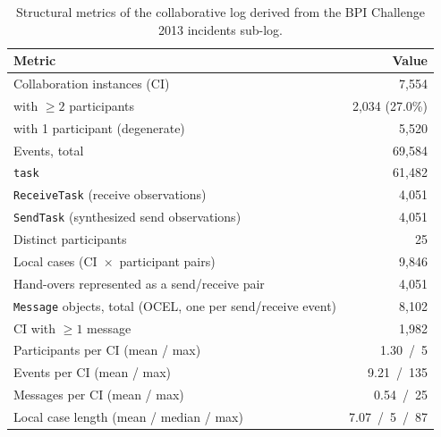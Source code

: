 \begin{table}[t]
\centering
\caption{Structural metrics of the collaborative log derived from the BPI
Challenge 2013 incidents sub-log.}
\label{tab:bpi2013-collab-metrics}
\begin{tabular}{lr}
\toprule
Metric & Value \\
\midrule
Collaboration instances (CI) & 7{,}554 \\
\quad with $\geq 2$ participants & 2{,}034 (27.0\%) \\
\quad with 1 participant (degenerate) & 5{,}520 \\
Events, total & 69{,}584 \\
\quad \texttt{task} & 61{,}482 \\
\quad \texttt{ReceiveTask} (receive observations) & 4{,}051 \\
\quad \texttt{SendTask} (synthesized send observations) & 4{,}051 \\
Distinct participants & 25 \\
Local cases (CI~$\times$~participant pairs) & 9{,}846 \\
Hand-overs represented as a send/receive pair & 4{,}051 \\
\texttt{Message} objects, total (OCEL, one per send/receive event) & 8{,}102 \\
CI with $\geq 1$ message & 1{,}982 \\
Participants per CI (mean / max) & 1.30~/~5 \\
Events per CI (mean / max) & 9.21~/~135 \\
Messages per CI (mean / max) & 0.54~/~25 \\
Local case length (mean / median / max) & 7.07~/~5~/~87 \\
\bottomrule
\end{tabular}
\end{table}
